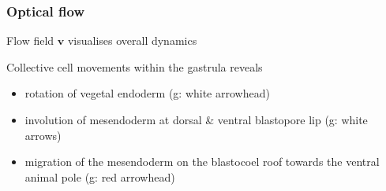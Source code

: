 \documentclass{beamer}
\renewcommand{\vec}{\mathbold}
\begin{document}
\begin{frame}
  \frametitle{Optical flow}
  Flow field $\vec{v}$ visualises overall dynamics   
  \begin{itemize}
\small{
  \item Collective cell movements within the gastrula reveals
    \begin{itemize}
    \item rotation of vegetal endoderm (g: white arrowhead)
    \item involution of  mesendoderm at dorsal \& ventral
      blastopore lip (g: white arrows)
    \item migration of the mesendoderm on the blastocoel roof towards
      the ventral animal pole (g: red arrowhead)
    \end{itemize}}
  \end{itemize}
  \vfill
\end{frame}
\end{document}
